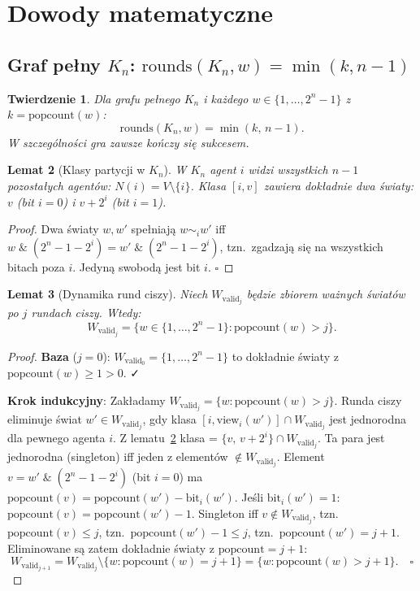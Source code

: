 \documentclass[12pt,a4paper]{article}
\theoremstyle{plain}
\newtheorem{theorem}{Twierdzenie}[section]
\newtheorem{lemma}[theorem]{Lemat}
\theoremstyle{definition}
\theoremstyle{remark}
\newcommand{\rounds}{\mathrm{rounds}}
\newcommand{\popcount}{\mathrm{popcount}}
\newcommand{\view}{\mathrm{view}}
\newcommand{\Wval}{W_{\mathrm{valid}}}
\begin{document}
\section{Dowody matematyczne}

\subsection{Graf pełny $K_n$: $\rounds(K_n,w) = \min(k, n-1)$}
\label{sec:proof_kn}

\begin{theorem}
\label{thm:kn}
Dla grafu pełnego $K_n$ i każdego $w \in \{1,\ldots,2^n{-}1\}$ z $k = \popcount(w)$:
$$\rounds(K_n, w) = \min(k,\, n-1).$$
W szczególności gra zawsze kończy się sukcesem.
\end{theorem}

\begin{lemma}[Klasy partycji w $K_n$]
\label{lem:kn_classes}
W $K_n$ agent $i$ widzi wszystkich $n{-}1$ pozostałych agentów: $N(i) = V \setminus \{i\}$. Klasa $[i,v]$ zawiera dokładnie dwa światy: $v$ (bit $i = 0$) i $v + 2^i$ (bit $i = 1$).
\end{lemma}

\begin{proof}
Dwa światy $w, w'$ spełniają $w \sim_i w'$ iff $w \;\&\; (2^n{-}1{-}2^i) = w' \;\&\; (2^n{-}1{-}2^i)$, tzn.\ zgadzają się na wszystkich bitach poza $i$. Jedyną swobodą jest bit $i$. $\square$
\end{proof}

\begin{lemma}[Dynamika rund ciszy]
\label{lem:kn_silence}
Niech $\Wval_j$ będzie zbiorem ważnych światów po $j$ rundach ciszy. Wtedy:
$$\Wval_j = \{w \in \{1,\ldots,2^n{-}1\} : \popcount(w) > j\}.$$
\end{lemma}

\begin{proof}
\textbf{Baza} ($j=0$): $\Wval_0 = \{1,\ldots,2^n{-}1\}$ to dokładnie światy z $\popcount(w) \ge 1 > 0$. ✓

\textbf{Krok indukcyjny}: Zakładamy $\Wval_j = \{w : \popcount(w) > j\}$. Runda ciszy eliminuje świat $w' \in \Wval_j$, gdy klasa $[i, \view_i(w')] \cap \Wval_j$ jest jednorodna dla pewnego agenta $i$. Z lematu~\ref{lem:kn_classes} klasa = $\{v,\, v{+}2^i\} \cap \Wval_j$. Ta para jest jednorodna (singleton) iff jeden z elementów $\notin \Wval_j$. Element $v = w' \;\&\; (2^n{-}1{-}2^i)$ (bit $i = 0$) ma $\popcount(v) = \popcount(w') - \mathrm{bit}_i(w')$. Jeśli $\mathrm{bit}_i(w') = 1$: $\popcount(v) = \popcount(w') - 1$. Singleton iff $v \notin \Wval_j$, tzn.\ $\popcount(v) \le j$, tzn.\ $\popcount(w') - 1 \le j$, tzn.\ $\popcount(w') = j+1$. Eliminowane są zatem dokładnie światy z $\popcount = j+1$:
$$\Wval_{j+1} = \Wval_j \setminus \{w : \popcount(w) = j+1\} = \{w : \popcount(w) > j+1\}. \quad \square$$
\end{proof}
\end{document}
